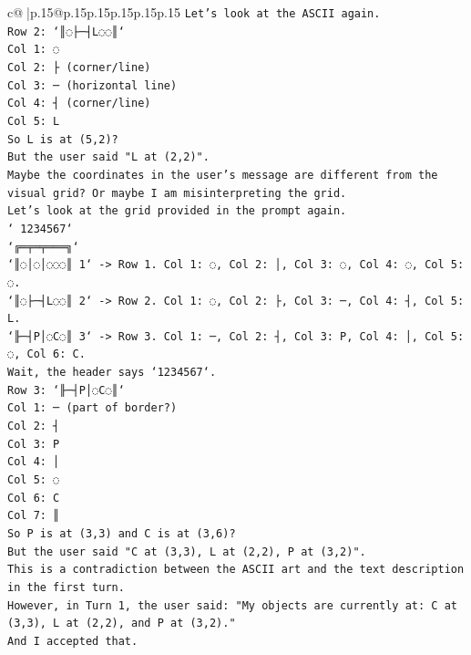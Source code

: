 \documentclass{article}
\begin{document}
{\begin{supertabular}{c@{$\;$}|p{.15\linewidth}@{}p{.15\linewidth}p{.15\linewidth}p{.15\linewidth}p{.15\linewidth}p{.15\linewidth}}
{{{\texttt{Let's look at the ASCII again.} \\
\texttt{Row 2: `║◌├─┤L◌◌║`} \\
\texttt{Col 1: ◌} \\
\texttt{Col 2: ├ (corner/line)} \\
\texttt{Col 3: ─ (horizontal line)} \\
\texttt{Col 4: ┤ (corner/line)} \\
\texttt{Col 5: L} \\
\texttt{So L is at (5,2)?} \\
\texttt{But the user said "L at (2,2)".} \\
\texttt{Maybe the coordinates in the user's message are different from the visual grid? Or maybe I am misinterpreting the grid.} \\
\texttt{Let's look at the grid provided in the prompt again.} \\
\texttt{` 1234567`} \\
\texttt{`╔═╤═╤═══╗`} \\
\texttt{`║◌│◌│◌◌◌║ 1` {-}> Row 1. Col 1: ◌, Col 2: │, Col 3: ◌, Col 4: ◌, Col 5: ◌.} \\
\texttt{`║◌├─┤L◌◌║ 2` {-}> Row 2. Col 1: ◌, Col 2: ├, Col 3: ─, Col 4: ┤, Col 5: L.} \\
\texttt{`╟─┤P│◌C◌║ 3` {-}> Row 3. Col 1: ─, Col 2: ┤, Col 3: P, Col 4: │, Col 5: ◌, Col 6: C.} \\
\texttt{Wait, the header says `1234567`.} \\
\texttt{Row 3: `╟─┤P│◌C◌║`} \\
\texttt{Col 1: ─ (part of border?)} \\
\texttt{Col 2: ┤} \\
\texttt{Col 3: P} \\
\texttt{Col 4: │} \\
\texttt{Col 5: ◌} \\
\texttt{Col 6: C} \\
\texttt{Col 7: ║} \\
\texttt{So P is at (3,3) and C is at (3,6)?} \\
\texttt{But the user said "C at (3,3), L at (2,2), P at (3,2)".} \\
\texttt{This is a contradiction between the ASCII art and the text description in the first turn.} \\
\texttt{However, in Turn 1, the user said: "My objects are currently at: C at (3,3), L at (2,2), and P at (3,2)."} \\
\texttt{And I accepted that.} \\
}}}
\end{supertabular}}
\end{document}
